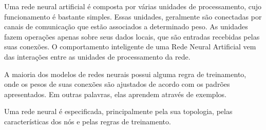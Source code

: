 Uma rede neural artificial é composta por várias unidades de processamento, cujo funcionamento é bastante simples. Essas unidades, geralmente são conectadas por canais de comunicação que estão associados a determinado peso. As unidades fazem operações apenas sobre seus dados locais, que são entradas recebidas pelas suas conexões. O comportamento inteligente de uma Rede Neural Artificial vem das interações entre as unidades de processamento da rede.

A maioria dos modelos de redes neurais possui alguma regra de treinamento, onde os pesos de suas conexões são ajustados de acordo com os padrões apresentados. Em outras palavras, elas aprendem através de exemplos.

Uma rede neural é especificada, principalmente pela sua topologia, pelas características dos nós e pelas regras de treinamento.


